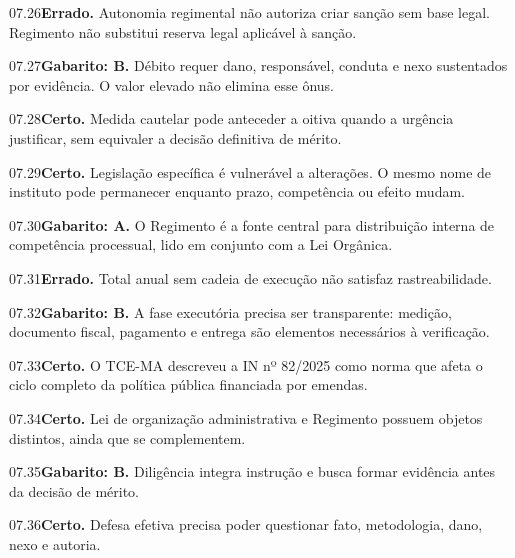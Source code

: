 \begin{solucao}{07.26}\textbf{Errado.} Autonomia regimental não autoriza criar sanção sem base legal. Regimento não substitui reserva legal aplicável à sanção.\end{solucao}
\begin{solucao}{07.27}\textbf{Gabarito: B.} Débito requer dano, responsável, conduta e nexo sustentados por evidência. O valor elevado não elimina esse ônus.\end{solucao}
\begin{solucao}{07.28}\textbf{Certo.} Medida cautelar pode anteceder a oitiva quando a urgência justificar, sem equivaler a decisão definitiva de mérito.\end{solucao}
\begin{solucao}{07.29}\textbf{Certo.} Legislação específica é vulnerável a alterações. O mesmo nome de instituto pode permanecer enquanto prazo, competência ou efeito mudam.\end{solucao}
\begin{solucao}{07.30}\textbf{Gabarito: A.} O Regimento é a fonte central para distribuição interna de competência processual, lido em conjunto com a Lei Orgânica.\end{solucao}
\begin{solucao}{07.31}\textbf{Errado.} Total anual sem cadeia de execução não satisfaz rastreabilidade.\end{solucao}
\begin{solucao}{07.32}\textbf{Gabarito: B.} A fase executória precisa ser transparente: medição, documento fiscal, pagamento e entrega são elementos necessários à verificação.\end{solucao}
\begin{solucao}{07.33}\textbf{Certo.} O TCE-MA descreveu a IN nº 82/2025 como norma que afeta o ciclo completo da política pública financiada por emendas.\end{solucao}
\begin{solucao}{07.34}\textbf{Certo.} Lei de organização administrativa e Regimento possuem objetos distintos, ainda que se complementem.\end{solucao}
\begin{solucao}{07.35}\textbf{Gabarito: B.} Diligência integra instrução e busca formar evidência antes da decisão de mérito.\end{solucao}
\begin{solucao}{07.36}\textbf{Certo.} Defesa efetiva precisa poder questionar fato, metodologia, dano, nexo e autoria.\end{solucao}
